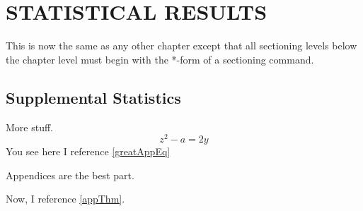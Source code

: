 \chapter{STATISTICAL RESULTS}

This is now the same as any other chapter except that
all sectioning levels below the chapter level must begin
with the *-form of a sectioning command.

\section*{Supplemental Statistics}

More stuff.
\begin{equation}
    \label{greatAppEq}
    z^2-a=2y
\end{equation}
You see here I reference \autoref{greatAppEq}
\begin{theorem}
    Appendices are the best part.
    \label{appThm}
\end{theorem}
Now, I reference \autoref{appThm}.